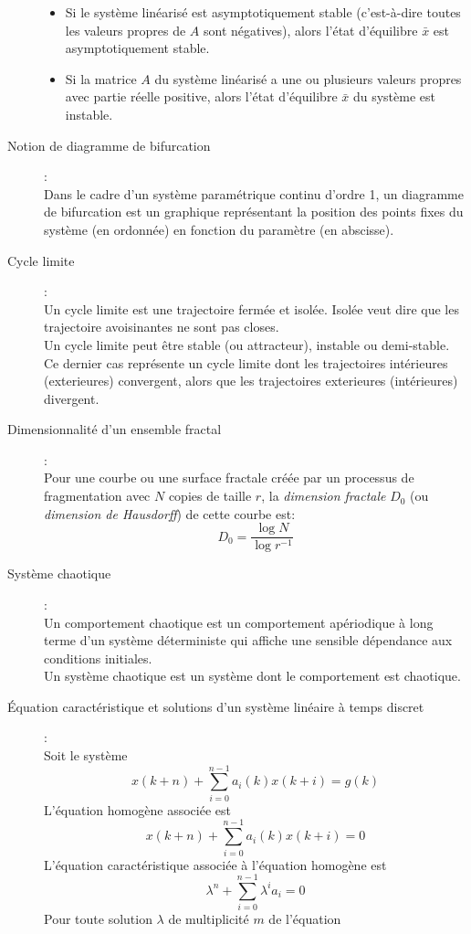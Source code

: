 \documentclass[a4paper]{article}
\begin{document}
\begin{description}
\begin{itemize}
			\item Si le système linéarisé est asymptotiquement stable
				(c'est-à-dire toutes les valeurs propres de \(A\) sont négatives),
				alors l'état d'équilibre \(\bar x\) est asymptotiquement stable.
			\item Si la matrice \(A\) du système linéarisé a une ou plusieurs valeurs
			propres avec partie réelle positive, alors l'état d'équilibre \(\bar x\)
			du système est instable.
		\end{itemize}
	\item [Notion de diagramme de bifurcation]:\\
		Dans le cadre d'un système paramétrique continu d'ordre 1, un diagramme
		de bifurcation est un graphique représentant la position des points fixes
		du système (en ordonnée) en fonction du paramètre (en abscisse).
	\item [Cycle limite]:\\
		Un cycle limite est une trajectoire fermée et isolée. Isolée veut dire
		que les trajectoire avoisinantes ne sont pas closes.\\
		Un cycle limite peut être stable (ou attracteur), instable ou demi-stable.
		Ce dernier cas représente un cycle limite dont les trajectoires intérieures
		(exterieures) convergent, alors que les trajectoires exterieures (intérieures)
		divergent.
	\item [Dimensionnalité d'un ensemble fractal]:\\
		Pour une courbe ou une surface fractale créée par un processus de
		fragmentation avec \(N\) copies de taille \(r\), la \emph{dimension
		fractale} \(D_0\) (ou \emph{dimension de Hausdorff}) de cette courbe est:
		\[D_0=\frac{\log N}{\log r^{-1}}\]
	\item [Système chaotique]:\\
		Un comportement chaotique est un comportement apériodique à long terme
		d'un système déterministe qui affiche une sensible dépendance aux
		conditions initiales.\\
		Un système chaotique est un système dont le comportement est chaotique.
	\item [Équation caractéristique et solutions d'un système linéaire à temps
discret]:\\
		Soit le système
		\[x(k+n)+\sum_{i=0}^{n-1}a_i(k)x(k+i)=g(k)\]
		L'équation homogène associée est
		\[x(k+n)+\sum_{i=0}^{n-1}a_i(k)x(k+i)=0\]
		L'équation caractéristique associée à l'équation homogène est
		\[\lambda^n+\sum_{i=0}^{n-1}\lambda^ia_i=0\]
		Pour toute solution \(\lambda\) de multiplicité \(m\) de l'équation

\end{description}
\end{document}
